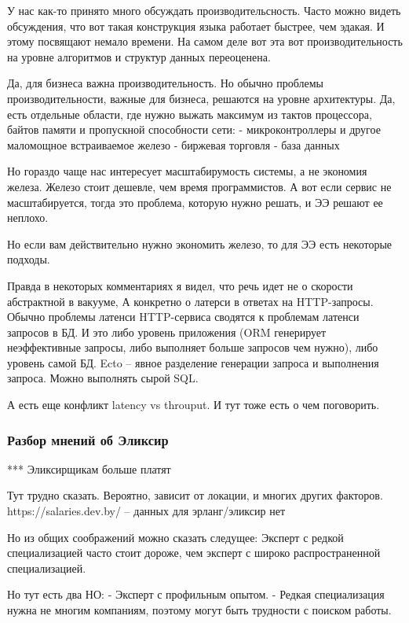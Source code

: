 \documentclass[10pt]{beamer}
\begin{document}
У нас как-то принято много обсуждать производительсность.
Часто можно видеть обсуждения, что вот такая конструкция языка работает быстрее, чем эдакая. И этому посвящают немало времени.
На самом деле вот эта вот производительность на уровне алгоритмов и структур данных переоценена.

Да, для бизнеса важна производительность. Но обычно проблемы производительности, важные для бизнеса, решаются на уровне архитектуры.
Да, есть отдельные области, где нужно выжать максимум из тактов процессора, байтов памяти и пропускной способности сети:
- микроконтроллеры и другое маломощное встраиваемое железо
- биржевая торговля
- база данных

Но гораздо чаще нас интересует масштабирумость системы, а не экономия железа.
Железо стоит дешевле, чем время программистов. А вот если сервис не масштабируется, тогда это проблема, которую нужно решать, и ЭЭ решают ее неплохо.

Но если вам действительно нужно экономить железо, то для ЭЭ есть некоторые подходы.

Правда в некоторых комментариях я видел, что речь идет не о скорости абстрактной в вакууме,
А конкретно о латерси в ответах на HTTP-запросы.
Обычно проблемы латенси HTTP-сервиса сводятся к проблемам латенси запросов в БД.
И это либо уровень приложения (ORM генерирует неэффективные запросы, либо выполняет больше запросов чем нужно),
либо уровень самой БД.
Ecto -- явное разделение генерации запроса и выполнения запроса. Можно выполнять сырой SQL.

А есть еще конфликт latency vs throuput. И тут тоже есть о чем поговорить.



\begin{frame}
\frametitle{Разбор мнений об Эликсир}
\centering
\par \bigskip
\end{frame}

*** Эликсирщикам больше платят

Тут трудно сказать. Вероятно, зависит от локации, и многих других факторов.
https://salaries.dev.by/ -- данных для эрланг/эликсир нет

Но из общих соображений можно сказать следущее:
Эксперт с редкой специализацией часто стоит дороже, чем эксперт с широко распространенной специализацией.

Но тут есть два НО:
- Эксперт с профильным опытом.
- Редкая специализация нужна не многим компаниям, поэтому могут быть трудности с поиском работы.
\end{document}
